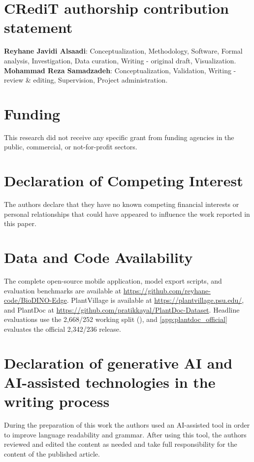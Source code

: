\section*{CRediT authorship contribution statement}
\textbf{Reyhane Javidi Alsaadi}: Conceptualization, Methodology, Software, Formal analysis, Investigation, Data curation, Writing - original draft, Visualization.
\textbf{Mohammad Reza Samadzadeh}: Conceptualization, Validation, Writing - review \& editing, Supervision, Project administration.

\section*{Funding}
This research did not receive any specific grant from funding agencies in the public, commercial, or not-for-profit sectors.

\section*{Declaration of Competing Interest}
The authors declare that they have no known competing financial interests or personal relationships that could have appeared to influence the work reported in this paper.

\section*{Data and Code Availability}
The complete open-source mobile application, model export scripts, and evaluation benchmarks are available at \url{https://github.com/reyhane-code/BioDINO-Edge}. PlantVillage is available at \url{https://plantvillage.psu.edu/}, and PlantDoc at \url{https://github.com/pratikkayal/PlantDoc-Dataset}. Headline evaluations use the 2{,}668/252 working split (), and \ref{app:plantdoc_official} evaluates the official 2{,}342/236 release.

\section*{Declaration of generative AI and AI-assisted technologies in the writing process}
During the preparation of this work the authors used an AI-assisted tool in order to improve language readability and grammar. After using this tool, the authors reviewed and edited the content as needed and take full responsibility for the content of the published article.

